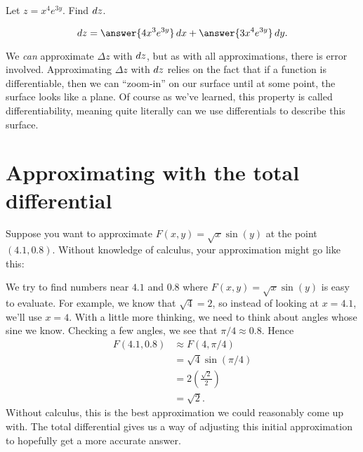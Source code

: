 \documentclass{ximera}
\begin{document}
\begin{question}
  Let $z = x^4e^{3y}$. Find $\mathop{}\!d z$.
  \begin{prompt}
    \[
    dz = \answer{4x^3e^{3y}}\d x+\answer{3x^4e^{3y}}\d y.
    \]
  \end{prompt}
\end{question}

We \textit{can} approximate $\Delta z$ with $\mathop{}\!d z$, but as with all
approximations, there is error involved. Approximating $\Delta z$ with
$\mathop{}\!d z$ relies on the fact that if a function is differentiable, then
we can ``zoom-in'' on our surface until at some point, the surface
looks like a plane. Of course as we've learned, this property is
called differentiability, meaning quite literally can we use
differentials to describe this surface.


\section{Approximating with the total differential}

Suppose you want to approximate $F(x,y)=\sqrt{x}\sin(y)$ at the point
$(4.1,0.8)$. Without knowledge of calculus, your approximation might
go like this:

We try to find numbers near $4.1$ and $0.8$ where
$F(x,y)=\sqrt{x}\sin(y)$ is easy to evaluate. For example, we know
that $\sqrt{4}= 2$, so instead of looking at $x=4.1$, we'll use
$x=4$. With a little more thinking, we need to think about angles
whose sine we know. Checking a few angles, we see that $\pi/4\approx
0.8$. Hence
\begin{align*}
  F(4.1,0.8) &\approx F(4,\pi/4) \\
  &= \sqrt{4}\sin(\pi/4)\\
  &= 2\left(\frac{\sqrt{2}}2\right)\\
  &= \sqrt{2}.
\end{align*}
Without calculus, this is the best approximation we could
reasonably come up with. The total differential gives us a way of
adjusting this initial approximation to hopefully get a more
accurate answer.
\end{document}
